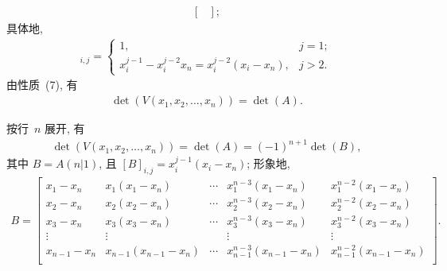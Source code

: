 \begin{example}
\begin{align*}
\begin{bmatrix}
        \end{bmatrix};
    \end{align*}
    具体地,
    \begin{align*}
        [A]_{i,j}
        =
        \begin{cases}
            1,
             & j = 1; \\
            x_i^{j-1} - x_i^{j-2} x_n
            = x_i^{j-2} (x_i - x_n),
             & j > 2.
        \end{cases}
    \end{align*}
    由性质~(7), 有
    \begin{align*}
        \det {(V(x_1, x_2, \dots, x_n))} = \det {(A)}.
    \end{align*}

    按行~\(n\) 展开, 有
    \begin{align*}
        \det {(V(x_1, x_2, \dots, x_n))}
        = \det {(A)}
        = (-1)^{n+1} \det {(B)},
    \end{align*}
    其中 \(B = A(n|1)\),
    且 \([B]_{i,j} = x_i^{j-1} (x_i - x_n)\);
    形象地,
    \begin{align*}
        B =
        \begin{bmatrix}
            x_1 - x_n     & x_1 (x_1 - x_n)         & \cdots & x_1^{n-3} (x_1 - x_n)         & x_1^{n-2} (x_1 - x_n)         \\
            x_2 - x_n     & x_2 (x_2 - x_n)         & \cdots & x_2^{n-3} (x_2 - x_n)         & x_2^{n-2} (x_2 - x_n)         \\
            x_3 - x_n     & x_3 (x_3 - x_n)         & \cdots & x_3^{n-3} (x_3 - x_n)         & x_3^{n-2} (x_3 - x_n)         \\
            \vdots        & \vdots                  & {}     & \vdots                        & \vdots                        \\
            x_{n-1} - x_n & x_{n-1} (x_{n-1} - x_n) & \cdots & x_{n-1}^{n-3} (x_{n-1} - x_n) & x_{n-1}^{n-2} (x_{n-1} - x_n) \\
        \end{bmatrix}.
    \end{align*}


\end{example}
